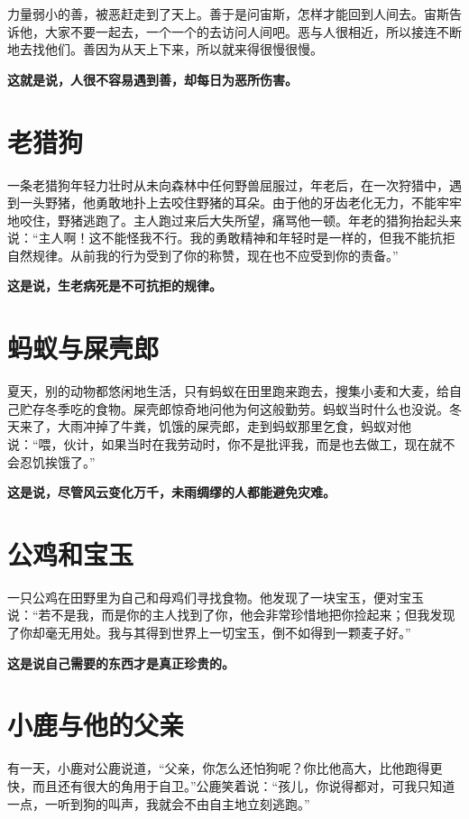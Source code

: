 力量弱小的善，被恶赶走到了天上。善于是问宙斯，怎样才能回到人间去。宙斯告诉他，大家不要一起去，一个一个的去访问人间吧。恶与人很相近，所以接连不断地去找他们。善因为从天上下来，所以就来得很慢很慢。

{\bfseries \color{red}这就是说，人很不容易遇到善，却每日为恶所伤害。}

\section{老猎狗}

一条老猎狗年轻力壮时从未向森林中任何野兽屈服过，年老后，在一次狩猎中，遇到一头野猪，他勇敢地扑上去咬住野猪的耳朵。由于他的牙齿老化无力，不能牢牢地咬住，野猪逃跑了。主人跑过来后大失所望，痛骂他一顿。年老的猎狗抬起头来说：“主人啊！这不能怪我不行。我的勇敢精神和年轻时是一样的，但我不能抗拒自然规律。从前我的行为受到了你的称赞，现在也不应受到你的责备。”

{\bfseries \color{red}这是说，生老病死是不可抗拒的规律。}

\section{蚂蚁与屎壳郎}

夏天，别的动物都悠闲地生活，只有蚂蚁在田里跑来跑去，搜集小麦和大麦，给自己贮存冬季吃的食物。屎壳郎惊奇地问他为何这般勤劳。蚂蚁当时什么也没说。冬天来了，大雨冲掉了牛粪，饥饿的屎壳郎，走到蚂蚁那里乞食，蚂蚁对他说：“喂，伙计，如果当时在我劳动时，你不是批评我，而是也去做工，现在就不会忍饥挨饿了。”

{\bfseries \color{red}这是说，尽管风云变化万千，未雨绸缪的人都能避免灾难。}

\section{公鸡和宝玉}

一只公鸡在田野里为自己和母鸡们寻找食物。他发现了一块宝玉，便对宝玉说：“若不是我，而是你的主人找到了你，他会非常珍惜地把你捡起来；但我发现了你却毫无用处。我与其得到世界上一切宝玉，倒不如得到一颗麦子好。”

{\bfseries \color{red}这是说自己需要的东西才是真正珍贵的。}

\section{小鹿与他的父亲}

有一天，小鹿对公鹿说道，“父亲，你怎么还怕狗呢？你比他高大，比他跑得更快，而且还有很大的角用于自卫。”公鹿笑着说：“孩儿，你说得都对，可我只知道一点，一听到狗的叫声，我就会不由自主地立刻逃跑。”

